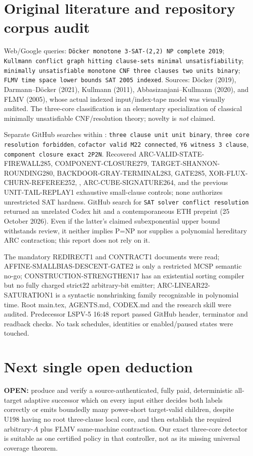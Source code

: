 \documentclass[11pt]{article}
\begin{document}
\section{Original literature and repository corpus audit}
Web/Google queries: \texttt{D\"ocker monotone 3-SAT-(2,2) NP complete 2019}; \texttt{Kullmann conflict graph hitting clause-sets minimal unsatisfiability}; \texttt{minimally unsatisfiable monotone CNF three clauses two units binary}; \texttt{FLMV time space lower bounds SAT 2005 indexed}. Sources: D\"ocker (2019), Darmann--D\"ocker (2021), Kullmann (2011), Abbasizanjani--Kullmann (2020), and FLMV (2005), whose actual indexed input/index-tape model was visually audited. The three-core classification is an elementary specialization of classical minimally unsatisfiable CNF/resolution theory; novelty is \emph{not} claimed.

Separate GitHub searches within : \texttt{three clause unit unit binary}, \texttt{three core resolution forbidden}, \texttt{cofactor valid M22 connected}, \texttt{Y6 witness 3 clause}, \texttt{component closure exact 2P2N}. Recovered ARC-VALID-STATE-FIREWALL285, COMPONENT-CLOSURE279, TARGET-SHANNON-ROUNDING280, BACKDOOR-GRAY-TERMINAL283, GATE285, XOR-FLUX-CHURN-REFEREE252, , ARC-CUBE-SIGNATURE264, and the previous UNIT-TAIL-REPLAY1 exhaustive small-clause controls; none authorizes unrestricted SAT hardness. GitHub search  for \texttt{SAT solver conflict resolution} returned an unrelated Codex hit and a contemporaneous  ETH preprint (25 October 2026). Even if the latter's claimed subexponential upper bound withstands review, it neither implies P=NP nor supplies a polynomial hereditary ARC contraction; this report does not rely on it.

The mandatory REDIRECT1 and CONTRACT1 documents were read; AFFINE-SMALLBIAS-DESCENT-GATE2 is only a restricted MCSP semantic no-go; CONSTRUCTION-STRENGTHEN17 has an existential sorting compiler but no fully charged strict22 arbitrary-bit emitter; ARC-LINEAR22-SATURATION1 is a syntactic nonshrinking family recognizable in polynomial time. Root main.tex, AGENTS.md, CODEX.md and the research skill were audited. Predecessor LSPV-5 16:48 report  passed GitHub header, terminator and readback checks. No task schedules, identities or enabled/paused states were touched.

\section{Next single open deduction}
\noindent\textbf{OPEN:} produce and verify a source-authenticated, fully paid, deterministic all-target adaptive successor which on every input either decides both labels correctly or emits boundedly many power-short target-valid children, despite U198 having no root three-clause local core, and then establish the required arbitrary-$A$ plus FLMV same-machine contraction. Our exact three-core detector is suitable as one certified policy in that controller, not as its missing universal coverage theorem.
\end{document}
